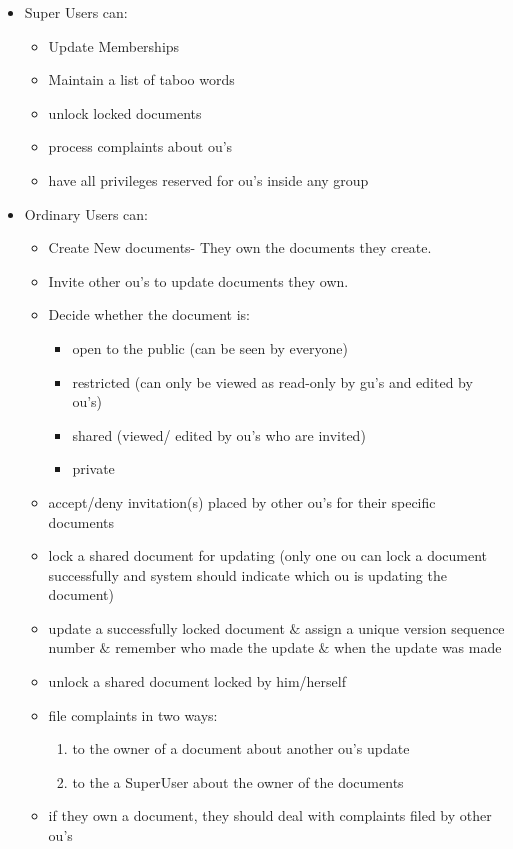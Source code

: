 \documentclass{article}
\begin{document}
	\begin{itemize}
		\item Super Users can:
		\begin{itemize}
			\item Update Memberships
			\item Maintain a list of taboo words
			\item unlock locked documents
			\item process complaints about ou's
			\item have all privileges reserved for ou's inside any group
		\end{itemize}
		\item Ordinary Users can:
		\begin{itemize}
			\item Create New documents- They own the documents they create.
			\item Invite other ou's to update documents they own.
			\item Decide whether the document is:
			\begin{itemize}
				\item open to the public (can be seen by everyone)
				\item restricted (can only be viewed as read-only by gu's and edited by ou's)
				\item shared (viewed/ edited by ou's who are invited)
				\item private
			\end{itemize} 
			\item accept/deny invitation(s) placed by other ou's for their specific documents
			\item lock a shared document for updating (only one ou can lock a document successfully and system should indicate which ou is updating the document)
			\item update a successfully locked document $\&$ assign a unique version sequence number $\&$ remember who made the update $\&$ when the update was made
			\item unlock a shared document locked by him/herself
			\item file complaints in two ways:
			\begin{enumerate}
				\item to the owner of a document about another ou's update
				\item to the a SuperUser about the owner of the documents
			\end{enumerate} 
			\item if they own a document, they should deal with complaints filed by other ou's

\end{itemize}
\end{itemize}
\end{document}
